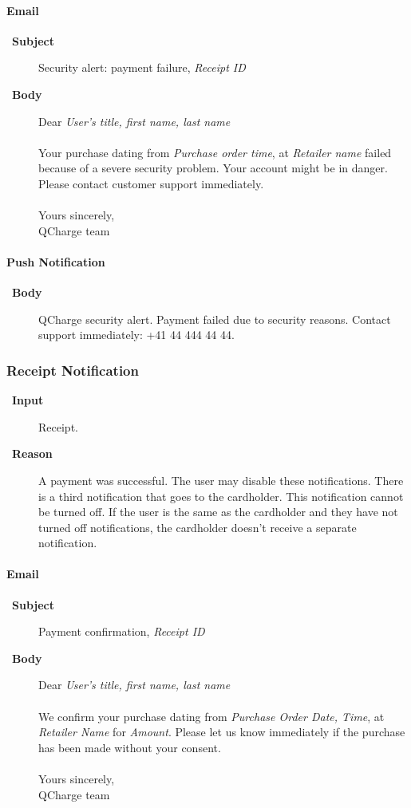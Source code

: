 \documentclass[a4paper,10pt]{article}
\let\Item\item
\newcommand\SpecialItem{\renewcommand\item[1][]{\Item[\textbullet~\bfseries##1]}
}
\begin{document}
\paragraph{Email}
\SpecialItem
\begin{description}
 \item[Subject] Security alert: payment failure, \emph{Receipt ID}
 \item[Body] Dear \emph{User's title, first name, last name}
\\\\
Your purchase dating from \emph{Purchase order time}, at \emph{Retailer name}
failed because of a severe security problem. Your account might be in danger. 
Please contact customer support immediately. 
\\\\
Yours sincerely,\\
QCharge team

\end{description}

\paragraph{Push Notification}
\SpecialItem
\begin{description}
 \item[Body] QCharge security alert. Payment failed due to security reasons. 
Contact support immediately: +41 44 444 44 44.
\end{description}

\subsubsection{Receipt Notification}

\SpecialItem
\begin{description}
 \item[Input] Receipt.
 \item[Reason] A payment was successful. The user may disable these 
notifications. There is a third notification that goes to the cardholder. This 
notification cannot be turned off. If the user is the same as the cardholder 
and they have not turned off notifications, the cardholder doesn't receive a 
separate notification.
\end{description}

\paragraph{Email}
\SpecialItem
\begin{description}
 \item[Subject] Payment confirmation, \emph{Receipt ID}
 \item[Body] Dear \emph{User's title, first name, last name}
\\\\
We confirm your purchase dating from \emph{Purchase Order Date, Time}, at 
\emph{Retailer Name} for \emph{Amount}. Please let us know immediately if the 
purchase has been made without your consent.
\\\\
Yours sincerely,\\
QCharge team
\end{description}
\end{document}
